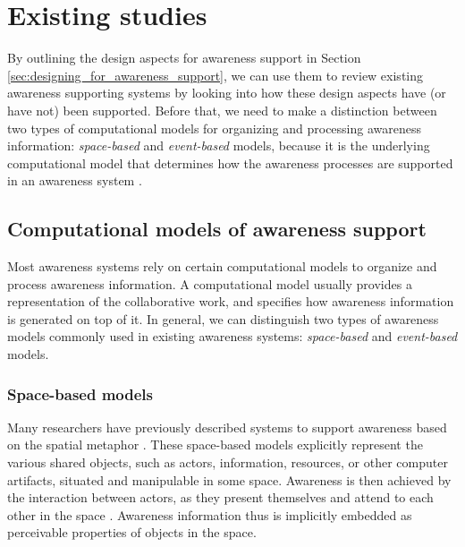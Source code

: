 
\section{Existing studies} %
\label{sec:the_state_of_art}
By outlining the design aspects for awareness support in Section \ref{sec:designing_for_awareness_support}, we can use them to review existing awareness supporting systems by looking into how these design aspects have (or have not) been supported. Before that, we need to make a distinction between two types of computational models for organizing and processing awareness information: \emph{space-based} and \emph{event-based} models, because it is the underlying computational model that determines how the awareness processes are supported in an awareness system \cite{Gross2004}.

\subsection{Computational models of awareness support} %
\label{sub:awareness_models}
Most awareness systems rely on certain computational models to organize and process awareness information. A computational model usually provides a representation of the collaborative work, and specifies how awareness information is generated on top of it. In general, we can distinguish two types of awareness models commonly used in existing awareness systems: \emph{space-based} and \emph{event-based} models. 

\subsubsection{Space-based models} %
\label{ssub:space_based_model}
Many researchers have previously described systems to support awareness based on the spatial metaphor \cite{Benford1993,Rodden1996,Sandor1997,simone2002a}. These space-based models explicitly represent the various shared objects, such as actors, information, resources, or other computer artifacts, situated and manipulable in some space. Awareness is then achieved by the interaction between actors, as they present themselves and attend to each other in the space \cite{Rodden1996}. Awareness information thus is implicitly embedded as perceivable properties of objects in the space.  

